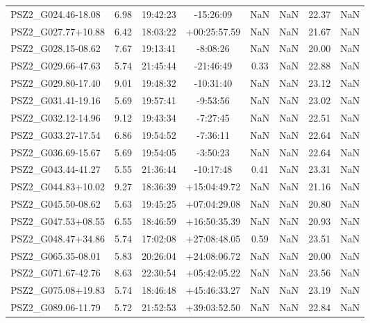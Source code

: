 \documentclass[apj, revtex4]{emulateapj}
\begin{document}
\begin{longtable*}{lccccccc}
    PSZ2\_G024.46-18.08 &  6.98 &  19:42:23 &     -15:26:09 &         NaN &    NaN &   22.37 &       NaN \\
    PSZ2\_G027.77+10.88 &  6.42 &  18:03:22 &  +00:25:57.59 &         NaN &    NaN &   21.67 &       NaN \\
    PSZ2\_G028.15-08.62 &  7.67 &  19:13:41 &      -8:08:26 &         NaN &    NaN &   20.00 &       NaN \\
    PSZ2\_G029.66-47.63 &  5.74 &  21:45:44 &     -21:46:49 &        0.33 &    NaN &   22.88 &       NaN \\
    PSZ2\_G029.80-17.40 &  9.01 &  19:48:32 &     -10:31:40 &         NaN &    NaN &   23.12 &       NaN \\
    PSZ2\_G031.41-19.16 &  5.69 &  19:57:41 &      -9:53:56 &         NaN &    NaN &   23.02 &       NaN \\
    PSZ2\_G032.12-14.96 &  9.12 &  19:43:34 &      -7:27:45 &         NaN &    NaN &   22.51 &       NaN \\
    PSZ2\_G033.27-17.54 &  6.86 &  19:54:52 &      -7:36:11 &         NaN &    NaN &   22.64 &       NaN \\
    PSZ2\_G036.69-15.67 &  5.69 &  19:54:05 &      -3:50:23 &         NaN &    NaN &   22.64 &       NaN \\
    PSZ2\_G043.44-41.27 &  5.55 &  21:36:44 &     -10:17:48 &        0.41 &    NaN &   23.31 &       NaN \\
    PSZ2\_G044.83+10.02 &  9.27 &  18:36:39 &  +15:04:49.72 &         NaN &    NaN &   21.16 &       NaN \\
    PSZ2\_G045.50-08.62 &  5.63 &  19:45:25 &  +07:04:29.08 &         NaN &    NaN &   20.80 &       NaN \\
    PSZ2\_G047.53+08.55 &  6.55 &  18:46:59 &  +16:50:35.39 &         NaN &    NaN &   20.93 &       NaN \\
    PSZ2\_G048.47+34.86 &  5.74 &  17:02:08 &  +27:08:48.05 &        0.59 &    NaN &   23.51 &       NaN \\
    PSZ2\_G065.35-08.01 &  5.83 &  20:26:04 &  +24:08:06.72 &         NaN &    NaN &   20.00 &       NaN \\
    PSZ2\_G071.67-42.76 &  8.63 &  22:30:54 &  +05:42:05.22 &         NaN &    NaN &   23.56 &       NaN \\
    PSZ2\_G075.08+19.83 &  5.74 &  18:46:48 &  +45:46:33.27 &         NaN &    NaN &   23.19 &       NaN \\
    PSZ2\_G089.06-11.79 &  5.72 &  21:52:53 &  +39:03:52.50 &         NaN &    NaN &   22.84 &       NaN \\

\end{longtable*}
\end{document}
